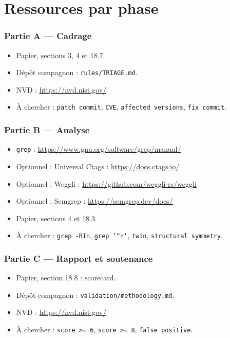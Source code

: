 \documentclass{training}
\begin{document}
\chapter{Ressources par phase}

\subsection*{Partie A --- Cadrage}
\begin{itemize}
  \item Papier, sections 3, 4 et 18.7.
  \item Dépôt compagnon : \texttt{rules/TRIAGE.md}.
  \item NVD : \url{https://nvd.nist.gov/}
  \item À chercher : \texttt{patch commit}, \texttt{CVE}, \texttt{affected
        versions}, \texttt{fix commit}.
\end{itemize}

\subsection*{Partie B --- Analyse}
\begin{itemize}
  \item \texttt{grep} : \url{https://www.gnu.org/software/grep/manual/}
  \item Optionnel : Universal Ctags : \url{https://docs.ctags.io/}
  \item Optionnel : Weggli : \url{https://github.com/weggli-rs/weggli}
  \item Optionnel : Semgrep : \url{https://semgrep.dev/docs/}
  \item Papier, sections 4 et 18.3.
  \item À chercher : \texttt{grep -RIn}, \texttt{grep '\string^+'}, \texttt{twin},
        \texttt{structural symmetry}.
\end{itemize}

\subsection*{Partie C --- Rapport et soutenance}
\begin{itemize}
  \item Papier, section 18.8 : scorecard.
  \item Dépôt compagnon : \texttt{validation/methodology.md}.
  \item NVD : \url{https://nvd.nist.gov/}
  \item À chercher : \texttt{score >= 6}, \texttt{score >= 8},
        \texttt{false positive}.
\end{itemize}
\end{document}
